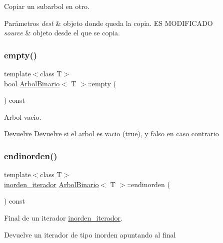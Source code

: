 Copiar un subarbol en otro. 


\begin{DoxyParams}{Parámetros}
{\em dest} & objeto donde queda la copia. ES M\+O\+D\+I\+F\+I\+C\+A\+DO \\
\hline
{\em source} & objeto desde el que se copia. \\
\hline
\end{DoxyParams}
\mbox{\label{classArbolBinario_a574a76889f9bb8a80080288a16f9441f}} 
\subsubsection{\texorpdfstring{empty()}{empty()}}
{\footnotesize\ttfamily template$<$class T$>$ \\
bool \hyperlink{classArbolBinario}{Arbol\+Binario}$<$ T $>$\+::empty (\begin{DoxyParamCaption}{ }\end{DoxyParamCaption}) const}



Arbol vacio. 

\begin{DoxyReturn}{Devuelve}
Devuelve si el arbol es vacio (true), y falso en caso contrario 
\end{DoxyReturn}
\mbox{\label{classArbolBinario_a62a0048bb6d35947409496b55b5bd303}} 
\subsubsection{\texorpdfstring{endinorden()}{endinorden()}}
{\footnotesize\ttfamily template$<$class T$>$ \\
\hyperlink{classArbolBinario_1_1inorden__iterador}{inorden\+\_\+iterador} \hyperlink{classArbolBinario}{Arbol\+Binario}$<$ T $>$\+::endinorden (\begin{DoxyParamCaption}{ }\end{DoxyParamCaption}) const}



Final de un iterador \hyperlink{classArbolBinario_1_1inorden__iterador}{inorden\+\_\+iterador}. 

\begin{DoxyReturn}{Devuelve}
un iterador de tipo inorden apuntando al final 
\end{DoxyReturn}
\mbox{\label{classArbolBinario_ad4ead2ad6b0e81f185fb540184a15bdb}} 

